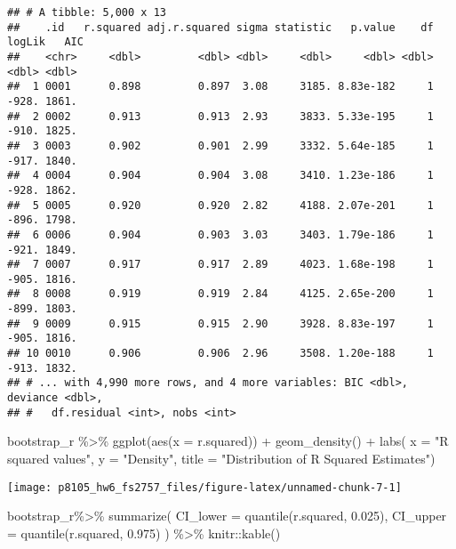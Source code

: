 \documentclass[
]{article}
\newenvironment{Shaded}{\begin{snugshade}}{\end{snugshade}}
\newcommand{\AttributeTok}[1]{\textcolor[rgb]{0.77,0.63,0.00}{#1}}
\newcommand{\FloatTok}[1]{\textcolor[rgb]{0.00,0.00,0.81}{#1}}
\newcommand{\FunctionTok}[1]{\textcolor[rgb]{0.00,0.00,0.00}{#1}}
\newcommand{\NormalTok}[1]{#1}
\newcommand{\SpecialCharTok}[1]{\textcolor[rgb]{0.00,0.00,0.00}{#1}}
\newcommand{\StringTok}[1]{\textcolor[rgb]{0.31,0.60,0.02}{#1}}
\begin{document}
\begin{verbatim}
## # A tibble: 5,000 x 13
##    .id   r.squared adj.r.squared sigma statistic   p.value    df logLik   AIC
##    <chr>     <dbl>         <dbl> <dbl>     <dbl>     <dbl> <dbl>  <dbl> <dbl>
##  1 0001      0.898         0.897  3.08     3185. 8.83e-182     1  -928. 1861.
##  2 0002      0.913         0.913  2.93     3833. 5.33e-195     1  -910. 1825.
##  3 0003      0.902         0.901  2.99     3332. 5.64e-185     1  -917. 1840.
##  4 0004      0.904         0.904  3.08     3410. 1.23e-186     1  -928. 1862.
##  5 0005      0.920         0.920  2.82     4188. 2.07e-201     1  -896. 1798.
##  6 0006      0.904         0.903  3.03     3403. 1.79e-186     1  -921. 1849.
##  7 0007      0.917         0.917  2.89     4023. 1.68e-198     1  -905. 1816.
##  8 0008      0.919         0.919  2.84     4125. 2.65e-200     1  -899. 1803.
##  9 0009      0.915         0.915  2.90     3928. 8.83e-197     1  -905. 1816.
## 10 0010      0.906         0.906  2.96     3508. 1.20e-188     1  -913. 1832.
## # ... with 4,990 more rows, and 4 more variables: BIC <dbl>, deviance <dbl>,
## #   df.residual <int>, nobs <int>
\end{verbatim}

\begin{Shaded}
\begin{Highlighting}[]
\NormalTok{bootstrap\_r }\SpecialCharTok{\%\textgreater{}\%} 
\FunctionTok{ggplot}\NormalTok{(}\FunctionTok{aes}\NormalTok{(}\AttributeTok{x =}\NormalTok{ r.squared)) }\SpecialCharTok{+} 
  \FunctionTok{geom\_density}\NormalTok{() }\SpecialCharTok{+}
   \FunctionTok{labs}\NormalTok{(}
      \AttributeTok{x =} \StringTok{"R squared values"}\NormalTok{,}
      \AttributeTok{y =} \StringTok{"Density"}\NormalTok{,}
      \AttributeTok{title =} \StringTok{"Distribution of R Squared Estimates"}\NormalTok{)}
\end{Highlighting}
\end{Shaded}

\texttt{[image: p8105\_hw6\_fs2757\_files/figure-latex/unnamed-chunk-7-1]}

\begin{Shaded}
\begin{Highlighting}[]
\NormalTok{bootstrap\_r}\SpecialCharTok{\%\textgreater{}\%} 
  \FunctionTok{summarize}\NormalTok{(}
    \AttributeTok{CI\_lower =} \FunctionTok{quantile}\NormalTok{(r.squared, }\FloatTok{0.025}\NormalTok{),}
    \AttributeTok{CI\_upper =} \FunctionTok{quantile}\NormalTok{(r.squared, }\FloatTok{0.975}\NormalTok{)}
\NormalTok{  ) }\SpecialCharTok{\%\textgreater{}\%} 
\NormalTok{  knitr}\SpecialCharTok{::}\FunctionTok{kable}\NormalTok{()}
\end{Highlighting}
\end{Shaded}
\end{document}
